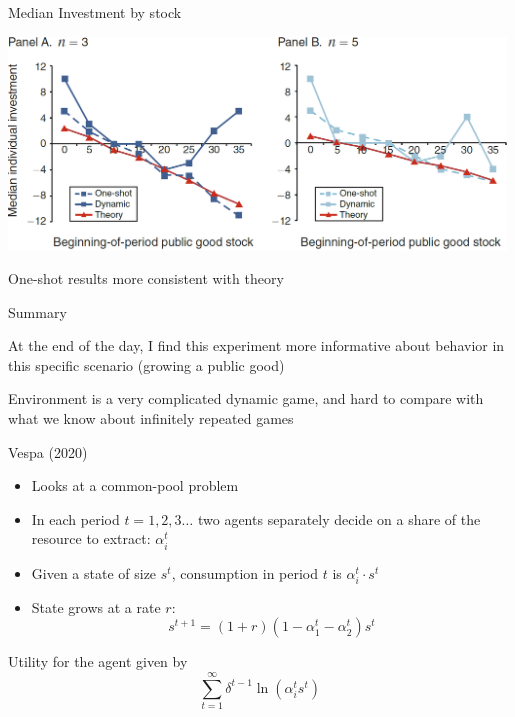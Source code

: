 \documentclass{beamer}
\begin{document}
\begin{frame}{Median Investment by stock}
\begin{card}
    \begin{center}
        \includegraphics[width=0.99\textwidth]{./i/BNPfig6.png}
    \end{center}
\end{card}


\begin{card}
   One-shot results more consistent with theory
\end{card}
\end{frame}

\begin{frame}{Summary}
    \begin{card}
At the end of the day, I find this experiment more informative about behavior in this specific scenario (growing a public good)
    \end{card}
    
\begin{card}
Environment is a very complicated dynamic game, and hard to compare with what we know about infinitely repeated games
\end{card}
\end{frame}

\begin{frame}{Vespa (2020) }
\begin{card}
	\begin{itemize}
		\item Looks at a common-pool problem
		\item In each period $t=1,2,3\ldots$ two agents separately decide on a share of the resource to extract: $\alpha^t_i$
		\item Given a state of size $s^t$, consumption in period $t$ is $\alpha_i^t\cdot s^t$ 
		\item State grows at a rate $r$: $$s^{t+1}=(1+r)(1-\alpha^t_1-\alpha^t_2)s^t$$
	\end{itemize}
	Utility for the agent given by
			$$\sum_{t=1}^\infty \delta^{t-1} \ln \left( \alpha^t_i s^t \right) $$
	\end{card}
\end{frame}
\end{document}
